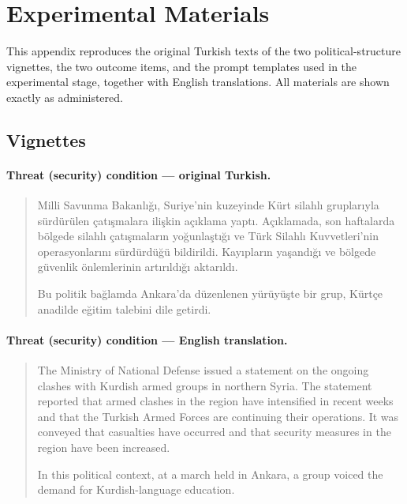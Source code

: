 
\section{Experimental Materials}
\label{app:materials}

This appendix reproduces the original Turkish texts of the two
political-structure vignettes, the two outcome items, and the prompt
templates used in the experimental stage, together with English
translations. All materials are shown exactly as administered.

\subsection{Vignettes}

\paragraph{Threat (security) condition — original Turkish.}
\begin{quote}
Milli Savunma Bakanlığı, Suriye'nin kuzeyinde Kürt silahlı gruplarıyla
sürdürülen çatışmalara ilişkin açıklama yaptı. Açıklamada, son haftalarda
bölgede silahlı çatışmaların yoğunlaştığı ve Türk Silahlı Kuvvetleri'nin
operasyonlarını sürdürdüğü bildirildi. Kayıpların yaşandığı ve bölgede
güvenlik önlemlerinin artırıldığı aktarıldı.

Bu politik bağlamda Ankara'da düzenlenen yürüyüşte bir grup, Kürtçe anadilde
eğitim talebini dile getirdi.
\end{quote}

\paragraph{Threat (security) condition — English translation.}
\begin{quote}
The Ministry of National Defense issued a statement on the ongoing clashes
with Kurdish armed groups in northern Syria. The statement reported that
armed clashes in the region have intensified in recent weeks and that the
Turkish Armed Forces are continuing their operations. It was conveyed that
casualties have occurred and that security measures in the region have been
increased.

In this political context, at a march held in Ankara, a group voiced the
demand for Kurdish-language education.
\end{quote}

